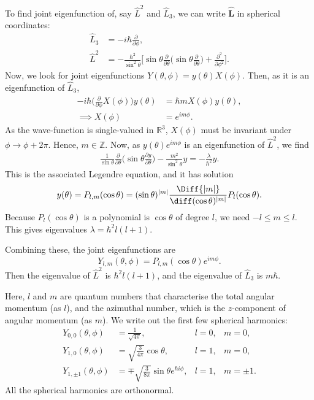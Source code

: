 \documentclass[12pt]{article}
\begin{document}
To find joint eigenfunction of, say $\hat L^2$ and $\hat L_3$, we can write $\mathbf{\hat L}$ in spherical coordinates:
\begin{align*}
	\hat L_3 &= - i \hbar \frac{\partial}{\partial \phi}, \\
	\hat L^2 &= - \frac{\hbar^2}{\sin^2 \theta} \bigg[ \sin \theta \frac{\partial}{\partial \theta} \biggl( \sin \theta \frac{\partial}{\partial \theta} \biggr) + \frac{\partial^2}{\partial \phi^2} \biggr].
\end{align*}
Now, we look for joint eigenfunctions $Y(\theta, \phi) = y(\theta) X(\phi)$. Then, as it is an eigenfunction of $\hat L_3$,
\begin{align*}
	- i \hbar \biggl( \frac{\partial}{\partial \phi} X(\phi) \biggr) y(\theta) &= \hbar m X(\phi) y (\theta), \\
	\implies X(\phi) &= e^{i m \phi}.
\end{align*}
As the wave-function is single-valued in $\mathbb{R}^3$, $X(\phi)$ must be invariant under $\phi \to \phi + 2\pi$. Hence, $m \in \mathbb{Z}$. Now, as $y(\theta)e^{im\phi}$ is an eigenfunction of $\hat L^2$, we find
\begin{align*}
	\frac{1}{\sin \theta}\frac{\partial}{\partial \theta} \biggl( \sin \theta \frac{\partial y}{\partial \theta} \biggr) - \frac{m^2}{\sin^2 \theta}y = - \frac{\lambda}{\hbar^2} y.
\end{align*}
This is the associated Legendre equation, and it has solution
\[
	y(\theta) = P_{l, m}(\cos \theta) = (\sin \theta)^{|m|}\frac{\Diff{|m|}}{\diff (\cos \theta)^{|m|}} P_l(\cos \theta)
.\]
Because $P_l(\cos \theta)$ is a polynomial is $\cos \theta$ of degree $l$, we need $-l \leq m \leq l$. This gives eigenvalues $\lambda = \hbar^2 l(l+1)$.

Combining these, the joint eigenfunctions are
\[
	Y_{l,m}(\theta, \phi) = P_{l, m}(\cos \theta) e^{i m \phi}
.\]
Then the eigenvalue of $\hat L^2$ is $\hbar^2 l(l+1)$, and the eigenvalue of $\hat L_3$ is $m \hbar$.

Here, $l$ and $m$ are quantum numbers that characterise the total angular momentum (as $l$), and the azimuthal  number, which is the $z$-component of angular momentum (as $m$). We write out the first few spherical harmonics:
\begin{align*}
	Y_{0,0}(\theta, \phi) &= \frac{1}{\sqrt{4\pi}}, & l = 0,& m = 0, \\
	Y_{1,0}(\theta, \phi) &= \sqrt{\frac{3}{4\pi}} \cos \theta, & l = 1,& m = 0, \\
	Y_{1, \pm 1}(\theta, \phi) &= \mp \sqrt{\frac{3}{8\pi}} \sin \theta e^{\hbar i \phi}, & l = 1,&m = \pm 1.
\end{align*}
All the spherical harmonics are orthonormal.
\end{document}
